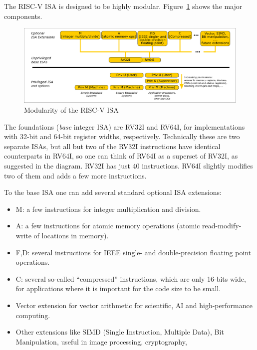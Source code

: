 \vspace{2ex}

The RISC-V ISA is designed to be highly modular.
Figure~\ref{Fig_ISA_Modularity} shows the major components.
\begin{figure}[htbp]
  \centerline{\includegraphics[width=6in,angle=0]{Figures/Fig_ISA_Modularity}}
  \caption{\label{Fig_ISA_Modularity} Modularity of the RISC-V ISA}
\end{figure}
The foundations (\emph{base} integer ISA) are RV32I and RV64I, for
implementations with 32-bit and 64-bit register widths, respectively.
Technically these are two separate ISAs, but all but two of the RV32I
instructions have identical counterparts in RV64I, so one can think of
RV64I as a superset of RV32I, as suggested in the diagram.  RV32I has
just 40 instructions.  RV64I slightly modifies two of them and adds a
few more instructions.

To the base ISA one can add several standard optional ISA extensions:

\begin{itemize}

  \item M: a few instructions for integer multiplication and division.

  \item A: a few instructions for atomic memory operations (atomic
        read-modify-write of locations in memory).

  \item F,D: several instructions for IEEE single- and
        double-precision floating point operations.

  \item C: several so-called ``compressed'' instructions, which are
        only 16-bits wide, for applications where it is important for
        the code size to be small.

  \item Vector extension for vector arithmetic for scientific, AI and
        high-performance computing.

  \item Other extensions like SIMD (Single Instruction, Multiple
        Data), Bit Manipulation, useful in image processing,
        cryptography, {\etc}

\end{itemize}

